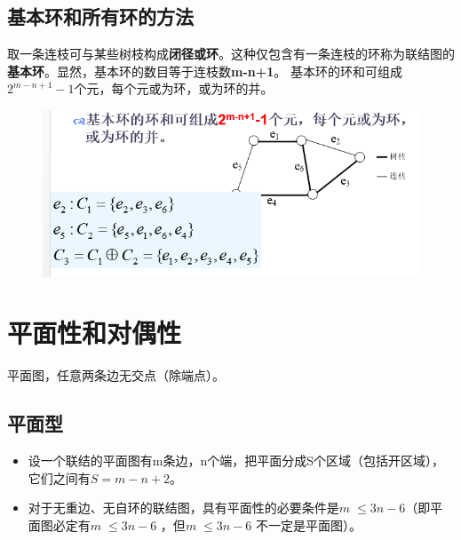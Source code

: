  \subsection{基本环和所有环的方法}                              
取一条连枝可与某些树枝构成\textbf{闭径或环}。这种仅包含有一条连枝的环称为联结图的\textbf{基本环}。显然，基本环的数目等于连枝数\textbf{m-n+1}。
基本环的环和可组成$ 2^{m-n+1}-1 $个元，每个元或为环，或为环的并。
\begin{figure}[H]
	\centering
	\includegraphics[width=0.7\linewidth]{figures/screenshot044}
	\caption{}
	\label{fig:screenshot044}
\end{figure}

\section{平面性和对偶性}
平面图，任意两条边无交点（除端点）。
\subsection{平面型}
\begin{itemize}
	\item 设一个联结的平面图有m条边，n个端，把平面分成S个区域（包括开区域），它们之间有$ S=m-n+2 $。
	\item 对于无重边、无自环的联结图，具有平面性的必要条件是$ m\le 3n-6 $（即平面图必定有$ m\le 3n-6 $ ，但$ m\le 3n-6 $ 不一定是平面图）。
\end{itemize}
